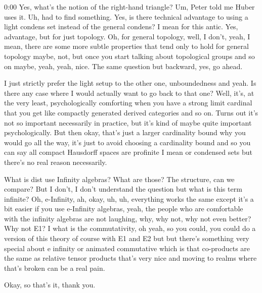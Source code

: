 \begin{unfinished}{0:00}
Yes, what's the notion of the right-hand triangle? Um, Peter told me Huber uses it. Uh, had to find something. Yes, is there technical advantage to using a light condens set instead of the general condens? I mean for this antic. Yes, advantage, but for just topology. Oh, for general topology, well, I don't, yeah, I mean, there are some more subtle properties that tend only to hold for general topology maybe, not, but once you start talking about topological groups and so on maybe, yeah, yeah, nice. The same question but backward, yes, go ahead.

I just strictly prefer the light setup to the other one, unboundedness and yeah. Is there any case where I would actually want to go back to that one? Well, it's, at the very least, psychologically comforting when you have a strong limit cardinal that you get like compactly generated derived categories and so on. Turns out it's not so important necessarily in practice, but it's kind of maybe quite important psychologically. But then okay, that's just a larger cardinality bound why you would go all the way, it's just to avoid choosing a cardinality bound and so you can say all compact Hausdorff spaces are profinite I mean or condensed sets but there's no real reason necessarily.

What is dist use Infinity algebras? What are those? The structure, can we compare? But I don't, I don't understand the question but what is this term infinite? Oh, e-Infinity, ah, okay, uh, uh, everything works the same except it's a bit easier if you use e-Infinity algebras, yeah, the people who are comfortable with the infinity algebras are not laughing, why, why not, why not even better? Why not E1? I what is the commutativity, oh yeah, so you could, you could do a version of this theory of course with E1 and E2 but but there's something very special about e infinity or animated commutative which is that co-products are the same as relative tensor products that's very nice and moving to realms where that's broken can be a real pain.

Okay, so that's it, thank you.
\end{unfinished}